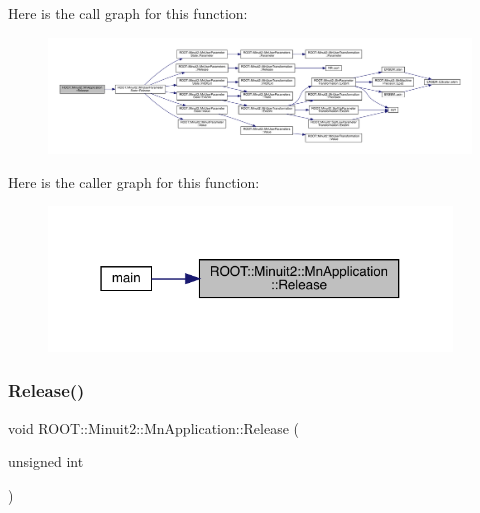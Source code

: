 Here is the call graph for this function\+:\nopagebreak
\begin{figure}[H]
\begin{center}
\leavevmode
\includegraphics[width=350pt]{df/dd5/classROOT_1_1Minuit2_1_1MnApplication_ab690313ed666d5a794a13b05054f5575_cgraph}
\end{center}
\end{figure}
Here is the caller graph for this function\+:\nopagebreak
\begin{figure}[H]
\begin{center}
\leavevmode
\includegraphics[width=304pt]{df/dd5/classROOT_1_1Minuit2_1_1MnApplication_ab690313ed666d5a794a13b05054f5575_icgraph}
\end{center}
\end{figure}
\mbox{\label{classROOT_1_1Minuit2_1_1MnApplication_ab690313ed666d5a794a13b05054f5575}} 
\subsubsection{\texorpdfstring{Release()}{Release()}\hspace{0.1cm}{\footnotesize\ttfamily [2/4]}}
{\footnotesize\ttfamily void R\+O\+O\+T\+::\+Minuit2\+::\+Mn\+Application\+::\+Release (\begin{DoxyParamCaption}\item[{unsigned int}]{ }\end{DoxyParamCaption})}

\mbox{\label{classROOT_1_1Minuit2_1_1MnApplication_a399bc86275d6ea481911be4a4b48d83c}} 
